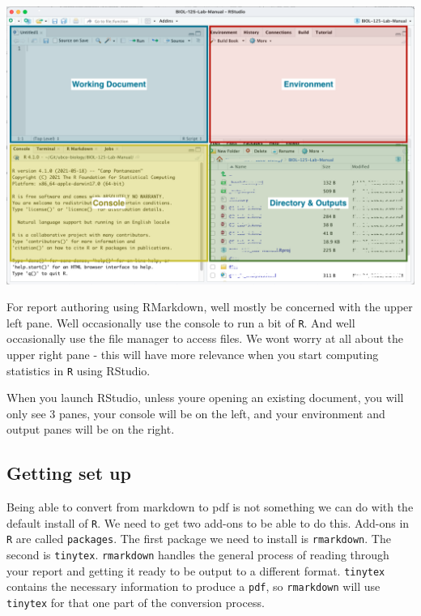 \documentclass[
]{book}
\begin{document}
\includegraphics{images/Intro-RStudio_20220101.png}

For report authoring using RMarkdown, we\textquotesingle ll mostly be concerned with the upper left pane. We\textquotesingle ll occasionally use the console to run a bit of \texttt{R}. And we\textquotesingle ll occasionally use the file manager to access files. We won\textquotesingle t worry at all about the upper right pane - this will have more relevance when you start computing statistics in \texttt{R} using RStudio.

When you launch RStudio, unless you\textquotesingle re opening an existing document, you will only see 3 panes, your console will be on the left, and your environment and output panes will be on the right.

\hypertarget{getting-set-up}{%
\subsection*{Getting set up}\label{getting-set-up}}

Being able to convert from markdown to pdf is not something we can do with the default install of \texttt{R}. We need to get two add-ons to be able to do this. Add-ons in \texttt{R} are called \texttt{packages}. The first package we need to install is \texttt{rmarkdown}. The second is \texttt{tinytex}. \texttt{rmarkdown} handles the general process of reading through your report and getting it ready to be output to a different format. \texttt{tinytex} contains the necessary information to produce a \texttt{pdf}, so \texttt{rmarkdown} will use \texttt{tinytex} for that one part of the conversion process.
\end{document}
